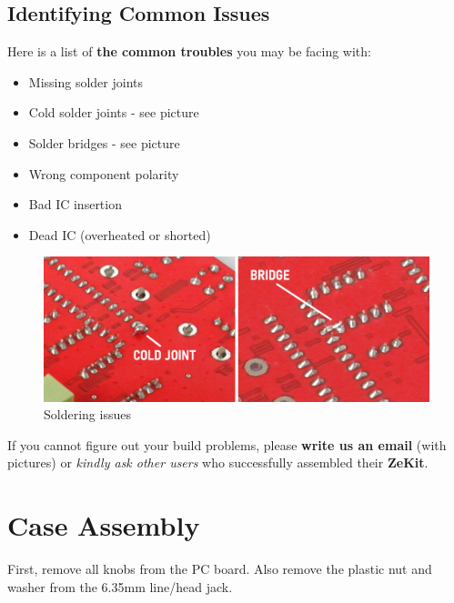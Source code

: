 \documentclass{scrartcl}
\begin{document}
\subsection{Identifying Common Issues}

Here is a list of \textbf{the common troubles} you may be facing with:

\begin{itemize}
    \item Missing solder joints
    \item Cold solder joints - see picture
    \item Solder bridges - see picture
    \item Wrong component polarity
    \item Bad IC insertion
    \item Dead IC (overheated or shorted)
\end{itemize}

\vspace{0.50cm}

\begin{figure}[!ht]
    \begin{center}
        \includegraphics[scale=0.42]{assets/solder-issues.jpg}
        \caption{Soldering issues}
    \end{center}
\end{figure}

If you cannot figure out your build problems, please \textbf{write us an email} (with pictures) or \emph{kindly ask other users} who successfully assembled their \textbf{ZeKit}.

\pagebreak

\section{Case Assembly}

First, remove all knobs from the PC board. Also remove the plastic nut and washer from the 6.35mm line/head jack.
\end{document}

